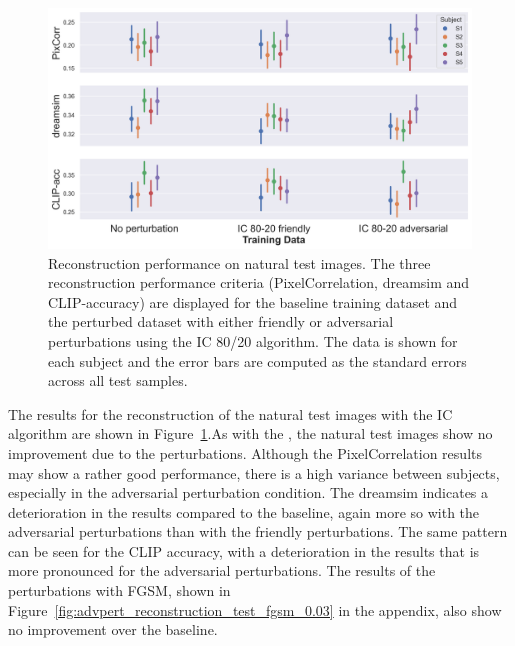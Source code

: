 \begin{figure}[ht]
    \centering
    \includegraphics[width=1\textwidth]{plots/advpert_reconstruction_test_ic_80-20.png}
    \caption[Experiment 3: Reconstruction performance on natural test images]{Reconstruction performance on natural test images. The three reconstruction performance criteria (PixelCorrelation, dreamsim and CLIP-accuracy) are displayed for the baseline training dataset and the perturbed dataset with either friendly or adversarial perturbations using the IC 80/20 algorithm. The data is shown for each subject and the error bars are computed as the standard errors across all test samples.}\label{fig:advpert_reconstruction_test_ic_80}
\end{figure}

The results for the reconstruction of the natural test images with the IC algorithm are shown in Figure~\ref{fig:advpert_reconstruction_test_ic_80}.As with the , the natural test images show no improvement due to the perturbations. Although the PixelCorrelation results may show a rather good performance, there is a high variance between subjects, especially in the adversarial perturbation condition. The dreamsim indicates a deterioration in the results compared to the baseline, again more so with the adversarial perturbations than with the friendly perturbations. The same pattern can be seen for the CLIP accuracy, with a deterioration in the results that is more pronounced for the adversarial perturbations. The results of the perturbations with FGSM, shown in Figure~\ref{fig:advpert_reconstruction_test_fgsm_0.03} in the appendix, also show no improvement over the baseline. 

